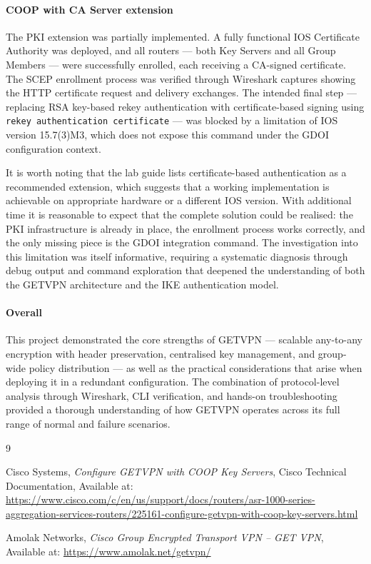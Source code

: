 \documentclass[12pt]{article}
\begin{document}
\paragraph{COOP with CA Server extension}

The PKI extension was partially implemented. A fully functional IOS Certificate 
Authority was deployed, and all routers — both Key Servers and all Group Members 
— were successfully enrolled, each receiving a CA-signed certificate. The SCEP 
enrollment process was verified through Wireshark captures showing the HTTP 
certificate request and delivery exchanges. The intended final step — replacing 
RSA key-based rekey authentication with certificate-based signing using 
\texttt{rekey authentication certificate} — was blocked by a limitation of IOS 
version 15.7(3)M3, which does not expose this command under the GDOI 
configuration context.

It is worth noting that the lab guide lists certificate-based authentication as 
a recommended extension, which suggests that a working implementation is 
achievable on appropriate hardware or a different IOS version. With additional 
time it is reasonable to expect that the complete solution could be realised: the PKI 
infrastructure is already in place, the enrollment process works correctly, and 
the only missing piece is the GDOI integration command. The investigation into 
this limitation was itself informative, requiring a systematic diagnosis through 
debug output and command exploration that deepened the understanding of both 
the GETVPN architecture and the IKE authentication model.

\paragraph{Overall}

This project demonstrated the core strengths of GETVPN — scalable 
any-to-any encryption with header preservation, centralised key management, and 
group-wide policy distribution — as well as the practical considerations that 
arise when deploying it in a redundant configuration. The combination of 
protocol-level analysis through Wireshark, CLI verification, and hands-on 
troubleshooting provided a thorough understanding of how GETVPN operates across 
its full range of normal and failure scenarios.

\begin{thebibliography}{9}

Cisco Systems,
\textit{Configure GETVPN with COOP Key Servers},
Cisco Technical Documentation,
Available at: \url{https://www.cisco.com/c/en/us/support/docs/routers/asr-1000-series-aggregation-services-routers/225161-configure-getvpn-with-coop-key-servers.html}

Amolak Networks,
\textit{Cisco Group Encrypted Transport VPN -- GET VPN},
Available at: \url{https://www.amolak.net/getvpn/}

\end{thebibliography}
\end{document}
